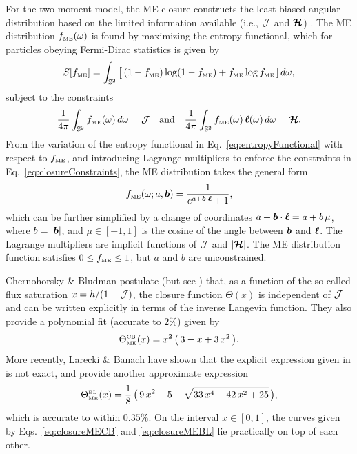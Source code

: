 For the two-moment model, the ME closure constructs the least biased angular distribution based on the limited information available (i.e., $\mathcal{J}$ and $\boldsymbol{\mathcal{H}}$) \cite{cernohorskyBludman_1994}.  
The ME distribution $f_{\mbox{\tiny ME}}(\omega)$ is found by maximizing the entropy functional, which for particles obeying Fermi-Dirac statistics is given by
\begin{equation}
  S[f_{\mbox{\tiny ME}}] 
  = \int_{\mathbb{S}^{2}}\big[\,(1-f_{\mbox{\tiny ME}})\log(1-f_{\mbox{\tiny ME}}) + f_{\mbox{\tiny ME}}\log f_{\mbox{\tiny ME}}\,]\,d\omega,
  \label{eq:entropyFunctional}
\end{equation} 
subject to the constraints
\begin{equation}
  \frac{1}{4\pi}\int_{\mathbb{S}^{2}}f_{\mbox{\tiny ME}}(\omega)\,d\omega=\mathcal{J}
  \quad\text{and}\quad
  \frac{1}{4\pi}\int_{\mathbb{S}^{2}}f_{\mbox{\tiny ME}}(\omega)\,\boldsymbol{\ell}(\omega)\,d\omega=\boldsymbol{\mathcal{H}}.  
  \label{eq:closureConstraints}
\end{equation}
From the variation of the entropy functional in Eq.~\eqref{eq:entropyFunctional} with respect to $f_{\mbox{\tiny ME}}$, and introducing Lagrange multipliers to enforce the constraints in Eq.~\eqref{eq:closureConstraints}, the ME distribution takes the general form
\begin{equation}
  f_{\mbox{\tiny ME}}(\omega;a,\boldsymbol{b})=\frac{1}{e^{a + \boldsymbol{b}\cdot\boldsymbol{\ell}}+1}, 
  \label{eq:fME}
\end{equation}
which can be further simplified by a change of coordinates $a + \boldsymbol{b}\cdot\boldsymbol{\ell}=a + b\,\mu$, where $b=|\boldsymbol{b}|$, and $\mu\in[-1,1]$ is the cosine of the angle between $\boldsymbol{b}$ and $\boldsymbol{\ell}$.  
The Lagrange multipliers are implicit functions of $\mathcal{J}$ and $|\boldsymbol{\mathcal{H}}|$.  
The ME distribution function satisfies $0 \le f_{\mbox{\tiny ME}} \le 1$, but $a$ and $b$ are unconstrained.  

Chernohorsky \& Bludman \cite{cernohorskyBludman_1994} postulate (but see \cite{lareckiBanach_2011}) that, as a function of the so-called flux saturation $x=h/(1-\mathcal{J})$, the closure function $\Theta(x)$ is independent of $\mathcal{J}$ and can be written explicitly in terms of the inverse Langevin function.  
They also provide a polynomial fit (accurate to $2\%$) given by
\begin{equation}
  \Theta_{\mbox{\tiny ME}}^{\mbox{\tiny CB}}(x)
  =x^{2}\,\big(\,3-x+3\,x^{2}\,\big).
  \label{eq:closureMECB}
\end{equation}
More recently, Larecki \& Banach \cite{lareckiBanach_2011} have shown that the explicit expression given in \cite{cernohorskyBludman_1994} is not exact, and provide another approximate expression
\begin{equation}
  \Theta_{\mbox{\tiny ME}}^{\mbox{\tiny BL}}(x)
  =\frac{1}{8}\,\big(\,9\,x^{2}-5+\sqrt{33\,x^{4}-42\,x^{2}+25}\,\big),
  \label{eq:closureMEBL}
\end{equation}
which is accurate to within $0.35\%$.  
On the interval $x\in[0,1]$, the curves given by Eqs.~\eqref{eq:closureMECB} and \eqref{eq:closureMEBL} lie practically on top of each other.  

